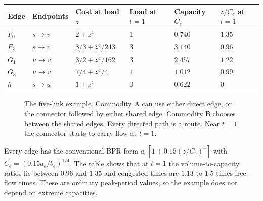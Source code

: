 \begin{center}
\begin{tabular}{llllll}
\toprule
Edge & Endpoints & Cost at load $z$ & Load at $t=1$ & Capacity $C_e$ & $z/C_e$ at $t=1$\\
\midrule
$F_0$ & $s\to v$ & $2+z^4$ & $1$ & $0.740$ & $1.35$\\
$F_2$ & $s\to v$ & $8/3+z^4/243$ & $3$ & $3.140$ & $0.96$\\
$G_1$ & $u\to v$ & $3/2+z^4/162$ & $3$ & $2.457$ & $1.22$\\
$G_3$ & $u\to v$ & $7/4+z^4/4$ & $1$ & $1.012$ & $0.99$\\
$h$ & $s\to u$ & $1+z^4$ & $0$ & $0.622$ & $0$\\
\bottomrule
\end{tabular}
\end{center}

\begin{figure}[htbp]
\centering
{}
\caption{The five-link example. Commodity A can use either direct edge, or the connector followed by either shared edge. Commodity B chooses between the shared edges. Every directed path is a route. Near $t=1$ the connector starts to carry flow at $t=1$.}
\label{fig:network}
\end{figure}

Every edge has the conventional BPR form $a_e[1+0.15(z/C_e)^4]$ with $C_e=(0.15a_e/b_e)^{1/4}$. The table shows that at $t=1$ the volume-to-capacity ratios lie between $0.96$ and $1.35$ and congested times are $1.13$ to $1.5$ times free-flow times. These are ordinary peak-period values, so the example does not depend on extreme capacities.

